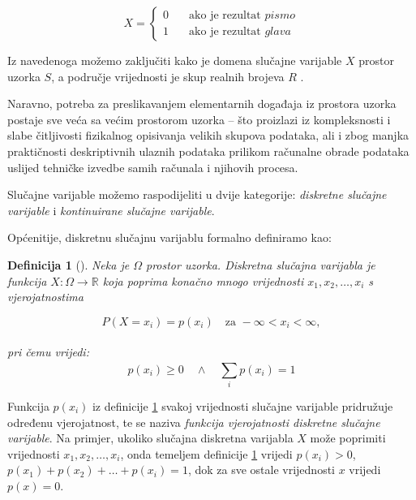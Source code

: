 \documentclass[a4paper,12pt,oneside]{memoir}
\newtheorem{definition}{Definicija}[chapter]
\begin{document}
                \begin{equation*}
                    X=\begin{cases}
                        0   &   \quad \text{ako je rezultat } \textit{pismo}\\
                        1   &   \quad \text{ako je rezultat } \textit{glava}
                    \end{cases}
                \end{equation*}
                
                Iz navedenoga možemo zaključiti kako je domena slučajne varijable $X$ prostor uzorka $S$, a područje vrijednosti je skup realnih brojeva $R$ \cite{Bahovec}.

                Naravno, potreba za preslikavanjem elementarnih događaja iz prostora uzorka postaje sve veća sa većim prostorom uzorka -- što proizlazi iz kompleksnosti i slabe čitljivosti fizikalnog opisivanja velikih skupova podataka, ali i zbog manjka praktičnosti deskriptivnih ulaznih podataka prilikom računalne obrade podataka uslijed tehničke izvedbe samih računala i njihovih procesa.

                Slučajne varijable možemo raspodijeliti u dvije kategorije: \textit{diskretne slučajne varijable} i \textit{kontinuirane slučajne varijable}.
                
                Općenitije, diskretnu slučajnu varijablu formalno definiramo kao:

                \begin{definition}[\cite{Dekking,Bahovec}]
                    Neka je $\Omega$ prostor uzorka. Diskretna slučajna varijabla je funkcija $X:\Omega\to\mathbb{R}$ koja poprima konačno mnogo vrijednosti $x_1,x_2,\ldots,x_i$ s vjerojatnostima

                    \begin{equation*}
                        P(X=x_i)=p(x_i) \quad   \text{za } -\infty<x_i<\infty,
                    \end{equation*}\\
                    pri čemu vrijedi:
                    \begin{equation*}
                        p(x_i)\geq 0 \quad \land \quad \displaystyle\sum_{i}^{}p(x_i)=1
                    \end{equation*}
                    \label{random_discrete_variable}
                \end{definition}

                Funkcija $p(x_i)$ iz definicije \ref{random_discrete_variable} svakoj vrijednosti slučajne varijable pridružuje određenu vjerojatnost, te se naziva \textit{funkcija vjerojatnosti diskretne slučajne varijable}. Na primjer, ukoliko slučajna diskretna varijabla $X$ može poprimiti vrijednosti $x_1,x_2,\ldots,x_i$, onda temeljem definicije \ref{random_discrete_variable} vrijedi $p(x_i)>0$, $p(x_1)+p(x_2)+\ldots+p(x_i)=1$, dok za sve ostale vrijednosti $x$ vrijedi $p(x)=0$.
\end{document}
